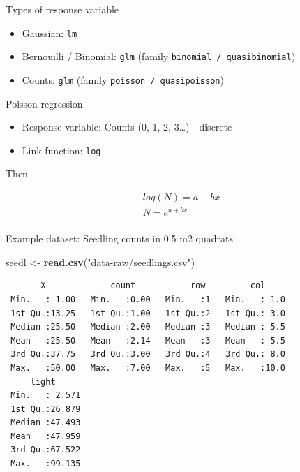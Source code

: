 \documentclass[10pt,ignorenonframetext,]{beamer}
\newenvironment{Shaded}{\begin{snugshade}}{\end{snugshade}}
\newcommand{\KeywordTok}[1]{\textcolor[rgb]{0.13,0.29,0.53}{\textbf{{#1}}}}
\newcommand{\StringTok}[1]{\textcolor[rgb]{0.31,0.60,0.02}{{#1}}}
\newcommand{\NormalTok}[1]{{#1}}
\begin{document}
\begin{frame}[fragile]{Types of response variable}

\begin{itemize}[<+->]
\item
  Gaussian: \texttt{lm}
\item
  Bernouilli / Binomial: \texttt{glm} (family
  \texttt{binomial\ /\ quasibinomial})
\item
  Counts: \texttt{glm} (family \texttt{poisson\ /\ quasipoisson})
\end{itemize}

\end{frame}

\begin{frame}[fragile]{Poisson regression}

\begin{itemize}[<+->]
\item
  Response variable: Counts (0, 1, 2, 3\ldots{}) - discrete
\item
  Link function: \texttt{log}
\end{itemize}

Then

\[
  \begin{aligned} 
  log(N) = a + bx \\  
  N = e^{a+bx} \\ 
  \end{aligned} 
\]

\end{frame}

\begin{frame}[fragile]{Example dataset: Seedling counts in 0.5 m2
quadrats}

\begin{Shaded}
\begin{Highlighting}[]
\NormalTok{seedl <-}\StringTok{ }\KeywordTok{read.csv}\NormalTok{(}\StringTok{"data-raw/seedlings.csv"}\NormalTok{)}
\end{Highlighting}
\end{Shaded}

\begin{verbatim}
       X             count           row         col      
 Min.   : 1.00   Min.   :0.00   Min.   :1   Min.   : 1.0  
 1st Qu.:13.25   1st Qu.:1.00   1st Qu.:2   1st Qu.: 3.0  
 Median :25.50   Median :2.00   Median :3   Median : 5.5  
 Mean   :25.50   Mean   :2.14   Mean   :3   Mean   : 5.5  
 3rd Qu.:37.75   3rd Qu.:3.00   3rd Qu.:4   3rd Qu.: 8.0  
 Max.   :50.00   Max.   :7.00   Max.   :5   Max.   :10.0  
     light       
 Min.   : 2.571  
 1st Qu.:26.879  
 Median :47.493  
 Mean   :47.959  
 3rd Qu.:67.522  
 Max.   :99.135  
\end{verbatim}

\end{frame}
\end{document}
